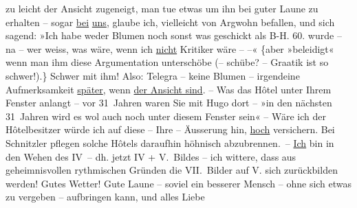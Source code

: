 \begin{ledgroupsized}[t]{13cm}
               zu leicht der Ansicht zugeneigt, man tue etwas um ihn bei guter Laune zu erhalten –
               sogar \uline{bei}{ }\uline{uns}, glaube ich, vielleicht von Argwohn befallen, und
               sich sagend: {\pb}»Ich habe weder
               Blumen noch sonst was geschickt als B-H. 60. wurde – na – wer weiss, was wäre, wenn
               ich \uline{nicht} Kritiker wäre – –« {\{}aber »beleidigt« wenn man ihm diese
               Argumentation unterschöbe (– schübe? – Gra{\geminationm}atik ist so
                  schwer!).{\}} Schwer mit ihm! Also: Telegra{\geminationm} – keine Blumen – irgendeine Aufmerksamkeit \uline{später}, wenn {\pb}\uline{\label{T_L02521_1v}\label{T_L02521_1h} der Ansicht sind}.\pend
           \pstart
           \numberlinefalse{}\centering{}–\numberlinetrue{}\pend
           \pstart
           \noindent{}Was das Hôtel unter Ihrem Fenster anlangt – vor 31 Jahren \introOben{}waren
                  Sie\introOben{} mit Hugo dort – »in den nächsten
               31 Jahren \introOben{}wird es\introOben{} wol auch noch unter diesem Fenster \introOben{}sein\introOben{}« – Wäre ich der Hôtelbesitzer würde ich auf diese – Ihre
               – Äusserung hin, \uline{hoch} versichern. Bei Schnitzler
               pflegen solche Hôtels daraufhin {\pb}höhnisch abzubrennen. – \uline{Ich} bin in den Wehen des
                  IV – dh. jetzt IV + V. Bildes – ich wittere, dass  aus geheimnisvollen rythmischen Gründen die VII. Bilder auf V.  sich zurückbilden werden!\pend
           \pstart
           {\pb}Gutes Wetter! Gute Laune – soviel
               ein besserer Mensch – ohne sich etwas zu vergeben – aufbringen kann, und alles Liebe

\end{ledgroupsized}
